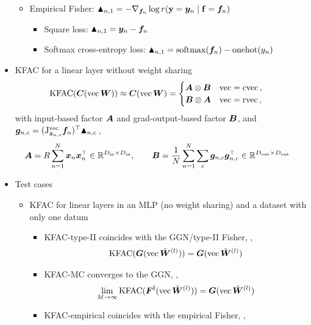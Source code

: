 \begin{itemize}
\begin{itemize}
    \item Empirical Fisher: $\blacktriangle_{n,1} = - \nabla_{{\bm{f}}_n} \log r({\mathbf{y}} = {\bm{y}}_n \mid {\mathbf{f}} = {\bm{f}}_n)$
      \begin{itemize}
      \item Square loss: $\blacktriangle_{n,1} = {\bm{y}}_n - {\bm{f}}_n$
      \item Softmax cross-entropy loss: $\blacktriangle_{n,1} = \mathrm{softmax}({\bm{f}}_n) - \mathrm{onehot}(y_n)$
      \end{itemize}
    \end{itemize}
  \item KFAC for a linear layer without weight sharing
    \begin{align*}
      &\mathrm{KFAC}({\bm{C}}(\operatorname{vec} {\bm{W}})) \approx {\bm{C}}(\operatorname{vec} {\bm{W}})
      =
        \begin{cases}
          {\bm{A}} \otimes {\bm{B}} & \operatorname{vec} = \operatorname{cvec}\,,
          \\
          {\bm{B}} \otimes {\bm{A}} & \operatorname{vec} = \operatorname{rvec}\,,
        \end{cases}\,
    \end{align*}
    with input-based factor ${\bm{A}}$ and grad-output-based factor ${\bm{B}}$, and ${\bm{g}}_{n,c} = (\mathrm{J}_{{\bm{z}}_{n,s}}^{\operatorname{vec}}{\bm{f}}_n)^{\top} \blacktriangle_{n,c}\,$,
    \begin{align*}
      {\bm{A}} = R \sum_{n=1}^N {\bm{x}}_{n} {\bm{x}}_{n}^{\top} \in {\mathbb{R}}^{D_{\text{in}} \times D_{\text{in}}}, \qquad
      {\bm{B}} &= \frac{1}{N}\sum_{n=1}^N \sum_c {\bm{g}}_{n,c} {\bm{g}}_{n,c}^{\top}  \in {\mathbb{R}}^{D_{\text{out}} \times D_{\text{out}}}
    \end{align*}
  \item Test cases
    \begin{itemize}
      \item KFAC for linear layers in an MLP (no weight sharing) and a dataset with only one datum
        \begin{itemize}
          \item KFAC-type-II coincides with the GGN/type-II Fisher, \ie,
            \begin{align*}
              \mathrm{KFAC}({\bm{G}}(\operatorname{vec}\tilde{{\bm{W}}}^{(l)})) = {\bm{G}}(\operatorname{vec} \tilde{{\bm{W}}}^{(l)})
            \end{align*}
          \item KFAC-MC converges to the GGN, \ie,
            \begin{align*}
              \lim_{M \to \infty} \mathrm{KFAC}({\bm{F}}^{\text{I}}(\operatorname{vec}\tilde{{\bm{W}}}^{(l)})) = {\bm{G}}(\operatorname{vec} \tilde{{\bm{W}}}^{(l)})
            \end{align*}
          \item KFAC-empirical coincides with the empirical Fisher, \ie,

\end{itemize}
\end{itemize}
\end{itemize}
